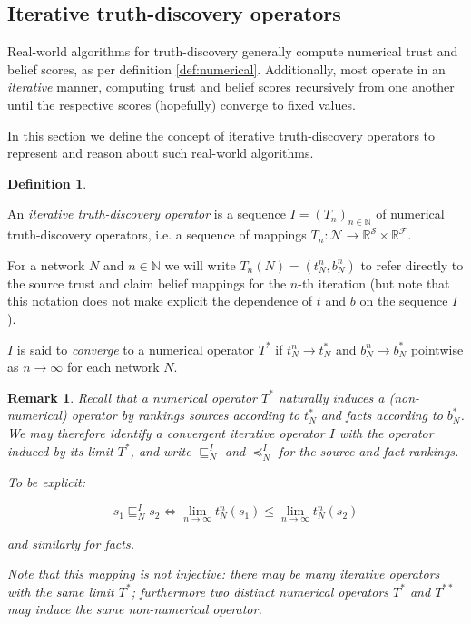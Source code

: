 \documentclass{article}
\theoremstyle{definition} \newtheorem{definition}{Definition}
\theoremstyle{definition} \newtheorem{example}{Example}
\theoremstyle{plain} \newtheorem{axiom}{Axiom}
\theoremstyle{plain} \newtheorem*{remark}{Remark}
\theoremstyle{remark} \newtheorem*{notation}{Notation}
\theoremstyle{plain} \newtheorem{lemma}{Lemma}
\theoremstyle{plain} \newtheorem{theorem}{Theorem}
\theoremstyle{plain} \newtheorem{proposition}{Proposition}
\renewcommand{\S}{\mathcal{S}}  %
\newcommand{\F}{\mathcal{F}}
\newcommand{\N}{\mathcal{N}}
\newcommand{\R}{\mathbb{R}}
\newcommand{\Nat}{\mathbb{N}}
\newcommand{\sle}{\sqsubseteq}
\newcommand{\fle}{\preceq}
\begin{document}
\subsection{Iterative truth-discovery operators}

Real-world algorithms for truth-discovery generally compute numerical trust and
belief scores, as per definition \ref{def:numerical}. Additionally, most
operate in an \emph{iterative} manner, computing trust and belief scores
recursively from one another until the respective scores (hopefully) converge
to fixed values.

In this section we define the concept of iterative truth-discovery operators to
represent and reason about such real-world algorithms.

\begin{definition}
\label{def:iterative_operator}

An \emph{iterative truth-discovery operator} is a sequence $I=(T_n)_{n \in
\Nat}$ of numerical truth-discovery operators, i.e. a sequence of mappings $T_n
: \N \rightarrow \R^\S \times \R^\F$.

For a network $N$ and $n \in \Nat$ we will write $T_n(N) = (t_N^n, b_N^n)$ to
refer directly to the source trust and claim belief mappings for the $n$-th
iteration (but note that this notation does not make explicit the dependence of
$t$ and $b$ on the sequence $I$).

$I$ is said to \emph{converge} to a numerical operator $T^*$ if $t_N^n
\rightarrow t_N^*$ and $b_N^n \rightarrow b_N^*$ pointwise as $n \rightarrow
\infty$ for each network $N$.

\end{definition}

\begin{remark}
Recall that a numerical operator $T^*$ naturally induces a (non-numerical)
operator by rankings sources according to $t_N^*$ and facts according to
$b_N^*$. We may therefore identify a convergent iterative operator $I$ with the
operator induced by its limit $T^*$, and write $\sle_N^I$ and $\fle_N^I$ for
the source and fact rankings.

To be explicit:

$$ s_1 \sle_N^I s_2 \iff \lim_{n \rightarrow \infty}{t_N^n(s_1)} \le \lim_{n
\rightarrow \infty}{t_N^n(s_2)} $$

and similarly for facts.

Note that this mapping is not injective: there may be many iterative operators
with the same limit $T^*$; furthermore two distinct numerical operators $T^*$
and $T^{**}$ may induce the same non-numerical operator.
\end{remark}
\end{document}
